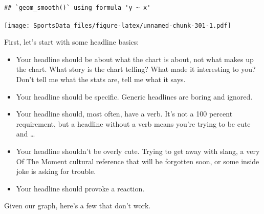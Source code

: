 \documentclass[
]{book}
\providecommand{\tightlist}{%
  \setlength{\itemsep}{0pt}\setlength{\parskip}{0pt}}
\begin{document}
\begin{verbatim}
## `geom_smooth()` using formula 'y ~ x'
\end{verbatim}

\texttt{[image: SportsData\_files/figure-latex/unnamed-chunk-301-1.pdf]}

First, let's start with some headline basics:

\begin{itemize}
\tightlist
\item
  Your headline should be about what the chart is about, not what makes up the chart. What story is the chart telling? What made it interesting to you? Don't tell me what the stats are, tell me what it says.
\item
  Your headline should be specific. Generic headlines are boring and ignored.
\item
  Your headline should, most often, have a verb. It's not a 100 percent requirement, but a headline without a verb means you're trying to be cute and \ldots{}
\item
  Your headline shouldn't be overly cute. Trying to get away with slang, a very Of The Moment cultural reference that will be forgotten soon, or some inside joke is asking for trouble.
\item
  Your headline should provoke a reaction.
\end{itemize}

Given our graph, here's a few that don't work.
\end{document}
